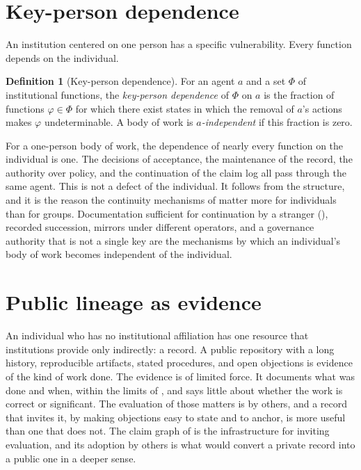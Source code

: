 \documentclass[11pt,twoside,openright]{book}
\theoremstyle{plain}
\theoremstyle{definition}
\newtheorem{definition}[theorem]{Definition}
\theoremstyle{remark}
\begin{document}
\section{Key-person dependence}

An institution centered on one person has a specific vulnerability. Every function depends on the individual.

\begin{definition}[Key-person dependence]\label{def:keyperson}
For an agent $a$ and a set $\Phi$ of institutional functions, the \emph{key-person dependence} of $\Phi$ on $a$ is the fraction of functions $\varphi\in\Phi$ for which there exist states in which the removal of $a$'s actions makes $\varphi$ undeterminable. A body of work is \emph{$a$-independent} if this fraction is zero.
\end{definition}

For a one-person body of work, the dependence of nearly every function on the individual is one. The decisions of acceptance, the maintenance of the record, the authority over policy, and the continuation of the claim log all pass through the same agent. This is not a defect of the individual. It follows from the structure, and it is the reason the continuity mechanisms of  matter more for individuals than for groups. Documentation sufficient for continuation by a stranger (), recorded succession, mirrors under different operators, and a governance authority that is not a single key are the mechanisms by which an individual's body of work becomes independent of the individual.

\section{Public lineage as evidence}

An individual who has no institutional affiliation has one resource that institutions provide only indirectly: a record. A public repository with a long history, reproducible artifacts, stated procedures, and open objections is evidence of the kind of work done. The evidence is of limited force. It documents what was done and when, within the limits of , and says little about whether the work is correct or significant. The evaluation of those matters is by others, and a record that invites it, by making objections easy to state and to anchor, is more useful than one that does not. The claim graph of  is the infrastructure for inviting evaluation, and its adoption by others is what would convert a private record into a public one in a deeper sense.
\end{document}
